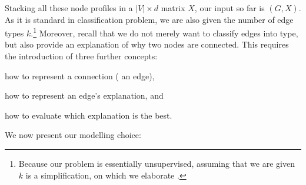 Stacking all these node profiles in a $|V| \times d$ matrix $X$, our input so far is $(G, X)$. As it
is standard in classification problem, we are also given the number of edge types
$k$.\footnote{Because our problem is essentially unsupervised, assuming that we are given $k$ is a
simplification, on which we elaborate .} Moreover, recall that we do not
merely want to classify edges into type, but also provide an explanation of why two nodes are
connected. This requires the introduction of three further concepts:
\begin{inparaenum}[1)]
\item how to represent a connection (\ie{} an edge),
\item how to represent an edge's explanation, and
\item how to evaluate which explanation is the best.
\end{inparaenum}
We now present our modelling choice:

